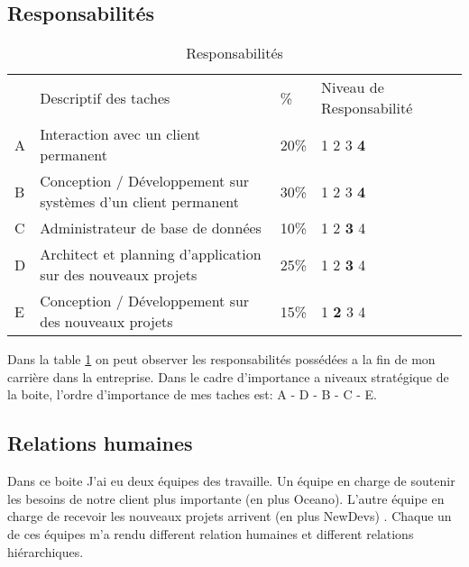 \documentclass{resume} %
\begin{document}
	\subsection{Responsabilités}
\begin{table}[!htbp]
\label{table-aufiero}
\begin{tabular}{|l|l|l|l|l}
\cline{1-4}
   & Descriptif des taches &  \% & Niveau de Responsabilité \footnotemark &  \\ \cline{1-4}
 A& Interaction avec un client permanent & 20\% & 1 2 3 \textbf{4}  &  \\ \cline{1-4}
 B& Conception / Développement sur systèmes d'un client permanent & 30\%&  1 2 3 \textbf{4} &  \\ \cline{1-4}
 C& Administrateur de base de données  & 10\%  & 1 2 \textbf{3} 4  &  \\ \cline{1-4}
 D& Architect et planning d’application sur des nouveaux projets & 25\% & 1 2 \textbf{3} 4 &  \\ \cline{1-4}
 E& Conception / Développement sur des nouveaux projets & 15\% &1 \textbf{2} 3 4   &  \\ \cline{1-4}
\end{tabular}

\caption{Responsabilités}
\end{table}
Dans la table \ref{table-aufiero}  on peut observer les responsabilités possédées a la fin de mon carrière dans la entreprise.
Dans le cadre d'importance a niveaux stratégique de la boite, l'ordre d'importance de mes taches est: A - D - B - C - E. 


\subsection{Relations humaines} 

	Dans ce boite J'ai eu deux équipes des travaille. Un équipe en charge de soutenir les besoins de notre client plus importante (en plus Oceano). L'autre équipe en charge de recevoir les nouveaux projets arrivent (en plus NewDevs)  . 
	Chaque un de ces équipes m'a rendu different relation humaines et different relations hiérarchiques.  
	
\end{document}
